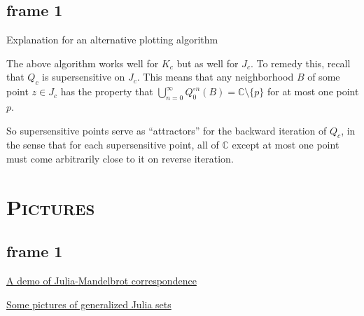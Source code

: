 \documentclass[xcolor=x11names,compress]{beamer}
\renewcommand{\(}{\begin{columns}}
\renewcommand{\)}{\end{columns}}
\newcommand{\<}[1]{\begin{column}{#1}}
\renewcommand{\>}{\end{column}}
\begin{document}

\subsection{frame 1}
\begin{frame}

Explanation for an alternative plotting algorithm

\vspace{.4cm}

The above algorithm works well for $K_c$ but as well for $J_c$.
To remedy this, recall that $Q_c$ is supersensitive on $J_c$.
This means that any neighborhood $B$ of some point $z\in J_c$ has
the property that 
$\bigcup_{n=0}^\infty Q_0^{\circ n} (B) = \mathbb{C} \setminus \{p\}$ for at most one point $p$.

\vspace{.4cm}

So supersensitive points serve as ``attractors'' for the backward iteration of $Q_c$, 
in the sense that for each supersensitive point, all of $\mathbb{C}$ except at most one point
must come arbitrarily close to it on reverse iteration. 


\end{frame}


\section{\scshape Pictures}

\subsection{frame 1}


\begin{frame}


\begin{itemize}
{\color{DeepSkyBlue4}
	\item \href{http://demonstrations.wolfram.com/JuliaSetsAndTheMandelbrotSet/}{A demo of Julia-Mandelbrot correspondence}
}
\end{itemize}



\vspace{.4cm}


\begin{itemize}
{\color{DeepSkyBlue4}
	\item \href{http://www.juliasets.dk/UFP.htm}{Some pictures of generalized Julia sets}
}
\end{itemize}





\end{frame}
\end{document}
